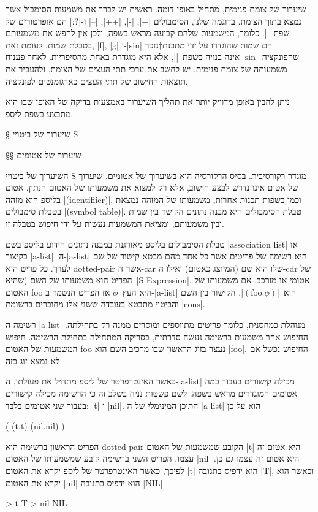 שיערוך של צומת פנימית, מתחיל באופן דומה. ראשית יש לברר את משמעות הסימבול אשר
נמצא בתוך הצומת. בדוגמה שלנו, הסימבולים \T|+|, \T|-|, \T|++|, \T|--| ו-\T|?:|
הם אופרטורים של שפת~\E|\CPL|. כלומר, המשמעות שלהם קבועה מראש בשפה, ולכן אין לחפש את
משמעותם בטבלת שמות. לעומת זאת, \T|f|, \T|g| ו-\T|sin| הם שמות שהוגדרו על ידי
מתכנת†{נזכר שהפונקציה~$\sin$ אינה בנויה בשפת~\E|\CPL|, אלא היא מוגדרת באחת
מהסיפריות.} לאחר פענוח משמעותה של צומת פנימית, יש לחשב את ערכי תתי העצים של
הצומת, ולהעביר את תוצאות החישוב של תתי העצים כארגומנטים לפונקציה.

ניתן להבין באופן מדוייק יותר את תהליך השיערוך באמצעות בדיקה של האופן שבו הוא
מתבצע בשפת ליספ.

§ שיערוך של ביטויי S

§§ שיערוך של אטומים

השיערוך של ביטויי-S מוגדר רקורסיבית. בסיס הרקורסיה הוא בשיערוך של אטומים.
שיערוך של אטום אינו נדרש לבצע חישוב, אלא רק למצוא את משמעותו של האטום הנתון.
אטום בליספ הוא מזהה \E|(identifiier)|, וכמו בשפות תכנות אחרות, משמעותו של המזהה
נמצאת בטבלת סימבולים \E|(symbol table)|. טבלת הסימבולים היא מבנה נתונים הקושר בין
שמות ובין משמעותם, ומציאת המשמעות נעשית על ידי חיפוש בטבלה זו.

טבלת הסימבולים בליספ מאורגנת במבנה נתונים הידוע בליספ בשם \E|association list| או
בקיצור \E|a-list|. ה-\E|a-list| היא רשימה של פריטים אשר כל אחד מהם מבטא קישור
של שם לערך. כל פריט הוא dotted-pair אשר ה-car שלו הוא שם
(המיוצג כאטום) ואילו ה-cdr של הפריט הוא משמעותו של השם (שהיא~\E|S-Expression|,
אטומי או מורכב. אם משמעותו של האטום foo היא העץ~$ϕ$ אז הפריט הנשמר ב-\E|a-list|
הוא~\E|$(\text{foo}.ϕ)$|. הקישור בין השם והביטוי מתבטא בעובדה ששני אלו מחוברים
ברשומת \E|cons|.

רשימה ה-\E|a-list| מנוהלת כמחסנית, כלומר פריטים מתווספים ומוסרים ממנה רק
בתחילתה. החיפוש אחר משמעות ברשימה נעשה סדרתית, בסריקה המתחילה בתחילת הרשימה.
חיפוש המשמעות של האטום foo נעצר בזוג הראשון שבו מרכיב השם הוא \E|foo|. החיפוש
נכשל אם לא נמצא זוג כזה.

כאשר האינטרפרטר של ליספ מתחיל את פעולתו, ה-\E|a-list| מכילה קישורים בעבור כמה
אטומים המוגדרים מראש בשפה. לשם פשטות נניח בשלב זה כי הרשימה מכילה קישורים בעבור
שני אטומים בלבד: \E|t| ו-\E|nil|.
התוכן המינימלי של ה-\E|a-list| הוא על כן
\begin{LISP}
(
  (t.t)
  (nil.nil)
)
\end{LISP}

הפריט הראשון ברשימה הוא dotted-pair הקובע שמשמעות של האטום \T|t| היא אטום זה
עצמו. הפריט השני ברשימה קובע שמשמעותו של האטום \T|nil| היא אטום זה עצמו גם כן.
לפיכך, כאשר האינטרפרטר של ליספ יקרא את האטום \T|t| הוא ידפיס בתגובה \T|T|, וכאשר
הוא יקרא את האטום \T|nil| הוא ידפיס בתגובה \T|NIL|.
\begin{LISP}
> t
T
> nil
NIL
\end{LISP}


